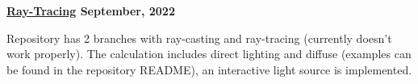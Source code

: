 \textbf{\href{https://github.com/jirol9xa/Ray-Tracing} {Ray-Tracing} \hfill  September, 2022} \par
\begin{itemize}
Repository has 2 branches with ray-casting and ray-tracing (currently doesn't work properly). The calculation includes direct lighting and diffuse (examples can be found in the repository README), an interactive light source is implemented.
\end{itemize} \par